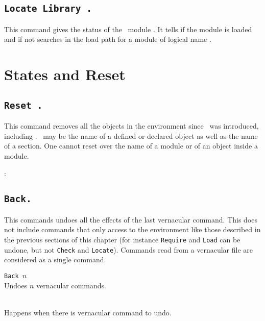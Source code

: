 \subsection{\tt Locate Library {\dirpath}.}
This command gives the status of the \Coq\ module {\dirpath}. It tells if the
module is loaded and if not searches in the load path for a module
of logical name {\dirpath}.

\section{States and Reset}

\subsection{\tt Reset \ident.}
This command removes all the objects in the environment since \ident\ 
was introduced, including \ident. \ident\ may be the name of a defined
or declared object as well as the name of a section.  One cannot reset
over the name of a module or of an object inside a module.

\begin{ErrMsgs}
\item \ident: 
\end{ErrMsgs}

\subsection{\tt Back.}

This commands undoes all the effects of the last vernacular
command. This does not include commands that only access to the
environment like those described in the previous sections of this
chapter (for instance {\tt Require} and {\tt Load} can be undone, but
not {\tt Check} and {\tt Locate}). Commands read from a vernacular
file are considered as a single command.

\begin{Variants}
\item {\tt Back $n$} \\
  Undoes $n$ vernacular commands.
\end{Variants}

\begin{ErrMsgs}
\item {} \\
  Happens when there is vernacular command to undo.
\end{ErrMsgs}

